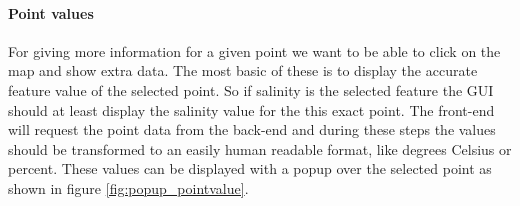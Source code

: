 \documentclass[11pt,a4paper,titlepage,oneside]{report}
\begin{document}
\paragraph{Point values}
For giving more information for a given point we want to be able to click on the map and show extra data. The most basic of these is to display the accurate feature value of the selected point. So if salinity is the selected feature the \gls{GUI} should at least display the salinity value for the this exact point. The \gls{front-end} will request the point data from the \gls{back-end} and during these steps the values should be transformed to an easily human readable format, like degrees Celsius or percent.
These values can be displayed with a popup over the selected point as shown in figure \ref{fig:popup_pointvalue}.
\begin{figure}[h]
\end{figure}
\end{document}

